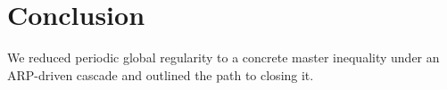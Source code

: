 \section{Conclusion}
We reduced periodic global regularity to a concrete master inequality under an ARP-driven cascade and outlined the path to closing it.
